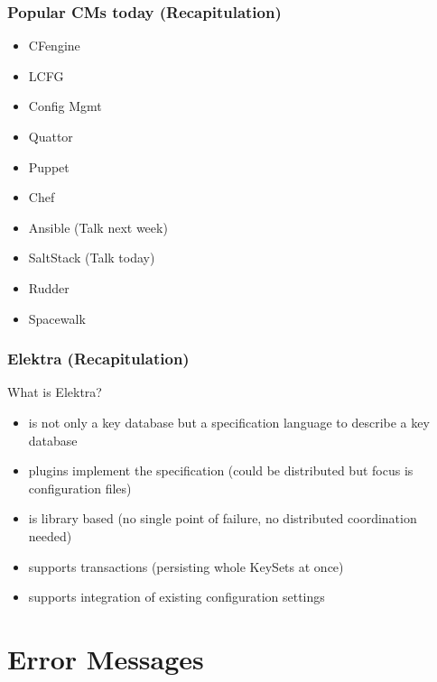 \begin{frame}
	\frametitle{Popular CMs today (Recapitulation)}

	\begin{itemize} %
	\item CFengine
	\item LCFG
	\item Config Mgmt
	\item Quattor
	\item Puppet
	\item Chef
	\item Ansible (Talk next week)
	\item SaltStack (Talk today)
	\item Rudder
	\item Spacewalk
	\end{itemize}
\end{frame}

\begin{frame}
	\frametitle{Elektra (Recapitulation)}

	\begin{task}
	What is Elektra?
	\end{task}

	\pause

	\begin{itemize}
	\item is not only a key database but a specification language to describe a key database
	\item plugins implement the specification (could be distributed but focus is configuration files)
	\item is library based (no single point of failure, no distributed coordination needed)
	\item supports transactions (persisting whole KeySets at once)
	\item supports integration of existing configuration settings
	\end{itemize}
\end{frame}



\section{Error Messages}

\subsection{}

